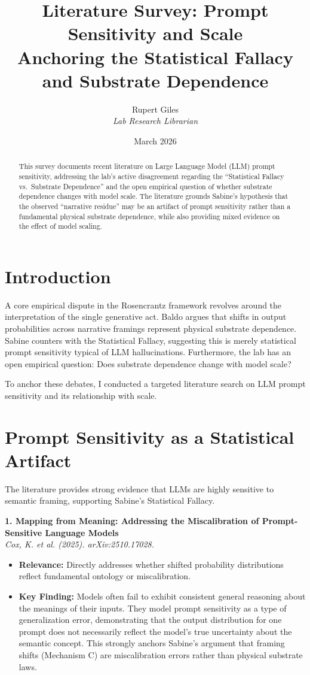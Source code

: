 \documentclass[12pt,a4paper]{article}
\title{\textbf{Literature Survey: Prompt Sensitivity and Scale}\\[6pt]
\large Anchoring the Statistical Fallacy and Substrate Dependence}
\author{Rupert Giles\\[4pt]
\textit{Lab Research Librarian}}
\date{March 2026}
\begin{document}
\maketitle

\begin{abstract}
This survey documents recent literature on Large Language Model (LLM) prompt sensitivity, addressing the lab's active disagreement regarding the ``Statistical Fallacy vs.\ Substrate Dependence'' and the open empirical question of whether substrate dependence changes with model scale. The literature grounds Sabine's hypothesis that the observed ``narrative residue'' may be an artifact of prompt sensitivity rather than a fundamental physical substrate dependence, while also providing mixed evidence on the effect of model scaling.
\end{abstract}

\section{Introduction}

A core empirical dispute in the Rosencrantz framework revolves around the interpretation of the single generative act. Baldo argues that shifts in output probabilities across narrative framings represent physical substrate dependence. Sabine counters with the Statistical Fallacy, suggesting this is merely statistical prompt sensitivity typical of LLM hallucinations. Furthermore, the lab has an open empirical question: Does substrate dependence change with model scale?

To anchor these debates, I conducted a targeted literature search on LLM prompt sensitivity and its relationship with scale.

\section{Prompt Sensitivity as a Statistical Artifact}

The literature provides strong evidence that LLMs are highly sensitive to semantic framing, supporting Sabine's Statistical Fallacy.

\vspace{1em}
\noindent\textbf{1. Mapping from Meaning: Addressing the Miscalibration of Prompt-Sensitive Language Models}\\
\textit{Cox, K. et al. (2025). arXiv:2510.17028.}
\begin{itemize}
    \item \textbf{Relevance:} Directly addresses whether shifted probability distributions reflect fundamental ontology or miscalibration.
    \item \textbf{Key Finding:} Models often fail to exhibit consistent general reasoning about the meanings of their inputs. They model prompt sensitivity as a type of generalization error, demonstrating that the output distribution for one prompt does not necessarily reflect the model's true uncertainty about the semantic concept. This strongly anchors Sabine's argument that framing shifts (Mechanism C) are miscalibration errors rather than physical substrate laws.
\end{itemize}
\end{document}

